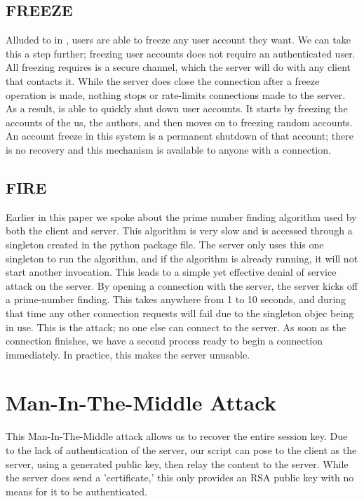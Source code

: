 \documentclass{article}
\newcommand{\code}[1]{\tcbox[
    on line,
    colback=codebackground, boxsep=2pt,
    colframe=white, boxrule=0pt,
    top=0pt, bottom=0pt, left=0pt, right=0pt
]{\texttt{#1}}}
\begin{document}
\subsection{FREEZE}
Alluded to in \code{FRAUDCLIENT}, users are able to freeze any user account they want. We can take this a step further; freezing user accounts does not require an authenticated user. All freezing requires is a secure channel, which the server will do with any client that contacts it. While the server does close the connection after a freeze operation is made, nothing stops or rate-limits connections made to the server.
As a result, \code{FREEZE} is able to quickly shut down user accounts. It starts by freezing the accounts of the us, the authors, and then moves on to freezing random accounts. An account freeze in this system is a permanent shutdown of that account; there is no recovery and this mechanism is available to anyone with a connection.

\subsection{FIRE}
Earlier in this paper we spoke about the prime number finding algorithm used by both the client and server. This algorithm is very slow and is accessed through a singleton created in the python package file. The server only uses this one singleton to run the algorithm, and if the algorithm is already running, it will not start another invocation. This leads to a simple yet effective denial of service attack on the server.
By opening a connection with the server, the server kicks off a prime-number finding. This takes anywhere from 1 to 10 seconds, and during that time any other connection requests will fail due to the singleton objec being in use.
This is the attack; no one else can connect to the server. As soon as the connection finishes, we have a second process ready to begin a connection immediately. In practice, this makes the server unusable.

\section{Man-In-The-Middle Attack}
This Man-In-The-Middle attack allows us to recover the entire session key.
Due to the lack of authentication of the server, our script can pose to the client as the server,
using a generated public key, then relay the content to the server.
While the server does send a 'certificate,' this only provides an RSA public key with no means for it to be authenticated.
\end{document}
